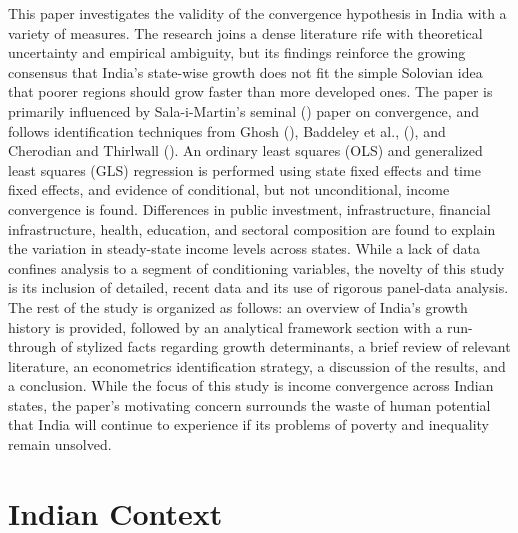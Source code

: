 \documentclass[a4paper, 11pt]{article}
\begin{document}
This paper investigates the validity of the convergence hypothesis in India with a variety of measures.  The research joins a dense literature rife with theoretical uncertainty and empirical ambiguity, but its findings reinforce the growing consensus that India's state-wise growth does not fit the simple Solovian idea that poorer regions should grow faster than more developed ones.  The paper is primarily influenced by Sala-i-Martin's seminal (\citeyear{sala1996classical}) paper on convergence, and follows identification techniques from Ghosh (\citeyear{ghosh_economic_2008}), Baddeley et al., (\citeyear{baddeley_divergence_2006}), and Cherodian and Thirlwall (\citeyear{cherodian_regional_2015}).  An ordinary least squares (OLS) and generalized least squares (GLS) regression is performed using state fixed effects and time fixed effects, and evidence of conditional, but not unconditional, income convergence is found.  Differences in public investment, infrastructure, financial infrastructure, health, education, and sectoral composition are found to explain the variation in steady-state income levels across states. While a lack of data confines analysis to a segment of conditioning variables, the novelty of this study is its inclusion of detailed, recent data and its use of rigorous panel-data analysis.  The rest of the study is organized as follows: an overview of India's growth history is provided, followed by an analytical framework section with a run-through of stylized facts regarding growth determinants, a brief review of relevant literature, an econometrics identification strategy, a discussion of the results, and a conclusion.  While the focus of this study is income convergence across Indian states, the paper's motivating concern surrounds the waste of human potential that India will continue to experience if its problems of poverty and inequality remain unsolved.\par

\section{Indian Context}
\end{document}
